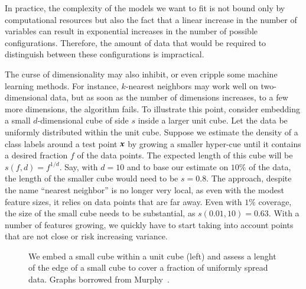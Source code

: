\begin{refsection}
In practice, the complexity of the models we want to fit is not bound only by computational resources but also the fact that a linear increase in the number of variables can result in exponential increases in the number of possible configurations. Therefore, the amount of data that would be required to distinguish between these configurations is impractical. 

The curse of dimensionality may also inhibit, or even cripple some machine learning methods. For instance, $k$-nearest neighbors may work well on two-dimensional data, but as soon as the number of dimensions increases, to a few more dimensions, the algorithm fails. To illustrate this point, consider embedding a small $d$-dimensional cube of side $s$ inside a larger unit cube. Let the data be uniformly distributed within the unit cube. Suppose we estimate the density of a class labels around a test point $\boldsymbol{x}$ by growing a smaller hyper-cue until it contains a desired fraction $f$ of the data points. The expected length of this cube will be $s(f,d)=f^{1/d}$. Say, with $d=10$ and to base our estimate on $10\%$ of the data, the length of the smaller cube would need to be $s=0.8$. The approach, despite the name ``nearest neighbor'' is no longer very local, as even with the modest feature sizes, it relies on data points that are far away. Even with $1\%$ coverage, the size of the small cube needs to be substantial, as $s(0.01,10)=0.63$. With a number of features growing, we quickly have to start taking into account points that are not close or risk increasing variance.

\begin{figure}[htbp]
\label{fig:lr-overfitting}
\caption{We embed a small cube within a unit cube (left) and assess a lenght of the edge of a small cube to cover a fraction of uniformly spread data. Graphs borrowed from Murphy~\cite{2012-Murphy}.}
\end{figure}


\printbibliography[heading=subbibliography]
\end{refsection}